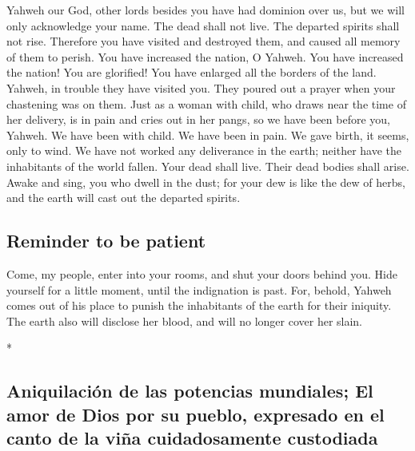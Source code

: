 \begin{paracol}{2}
\begin{otherlanguage}{english}
 Yahweh our God, other lords besides you have had
dominion over us, but we will only acknowledge your name.
 The dead shall not live. The departed spirits shall not
rise. Therefore you have visited and destroyed them, and caused all
memory of them to perish.  You have increased the nation,
O Yahweh. You have increased the nation! You are glorified! You have
enlarged all the borders of the land.  Yahweh, in trouble
they have visited you. They poured out a prayer when your chastening was
on them.  Just as a woman with child, who draws near the
time of her delivery, is in pain and cries out in her pangs, so we have
been before you, Yahweh.  We have been with child. We
have been in pain. We gave birth, it seems, only to wind. We have not
worked any deliverance in the earth; neither have the inhabitants of the
world fallen.  Your dead shall live. Their dead bodies
shall arise. Awake and sing, you who dwell in the dust; for your dew is
like the dew of herbs, and the earth will cast out the departed spirits.

\hypertarget{reminder-to-be-patient}{%
\subsection{Reminder to be patient}\label{reminder-to-be-patient}}

 Come, my people, enter into your rooms, and shut your
doors behind you. Hide yourself for a little moment, until the
indignation is past.  For, behold, Yahweh comes out of
his place to punish the inhabitants of the earth for their iniquity. The
earth also will disclose her blood, and will no longer cover her slain.

\end{otherlanguage}

\switchcolumn[0]*

\hypertarget{aniquilaciuxf3n-de-las-potencias-mundiales-el-amor-de-dios-por-su-pueblo-expresado-en-el-canto-de-la-viuxf1a-cuidadosamente-custodiada}{%
\subsection{Aniquilación de las potencias mundiales; El amor de Dios por
su pueblo, expresado en el canto de la viña cuidadosamente
custodiada}\label{aniquilaciuxf3n-de-las-potencias-mundiales-el-amor-de-dios-por-su-pueblo-expresado-en-el-canto-de-la-viuxf1a-cuidadosamente-custodiada}}


\end{paracol}

